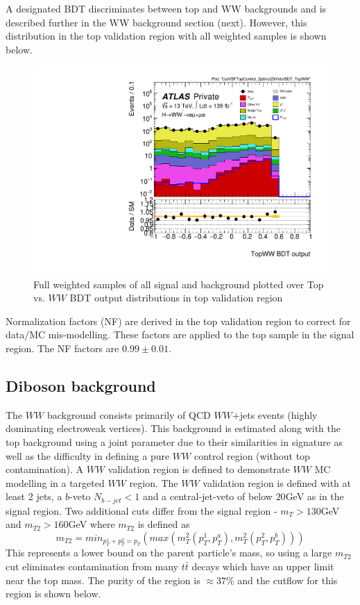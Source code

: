 A designated BDT discriminates between top and WW backgrounds and is described further in the WW background section (next). However, this distribution in the top validation region with all weighted samples is shown below. 

\begin{figure}[!htbp]
\centering
\includegraphics[width=.6\linewidth]{Pictures/run2-emme-CutVBFTopControl_2jetinclZttVeto-BDT_TopWW-log.pdf}
\caption{Full weighted samples of all signal and background plotted over Top vs. $WW$ BDT output distributions in top validation region}
\label{fig:TopWWBDTVR}
\end{figure}

Normalization factors (NF) are derived in the top validation region to correct for data/MC mis-modelling. These factors are applied to the top sample in the signal region. The NF factors are $0.99\pm0.01$. 

\subsection{Diboson background}

The $WW$ background consists primarily of QCD $WW$+jets events (highly dominating electroweak vertices). This background is estimated along with the top background using a joint parameter due to their similarities in signature as well as the difficulty in defining a pure $WW$ control region (without top contamination). A $WW$ validation region is defined to demonstrate $WW$ MC modelling in a targeted $WW$ region.  The $WW$ validation region is defined with at least 2 jets, a $b$-veto $N_{b-jet}<1$ and a central-jet-veto of below $20$GeV as in the signal region. Two additional cuts differ from the signal region - $m_T>130$GeV and $m_{T2}>160$GeV where $m_{T2}$ is defined as
\begin{equation}
m_{T2}=min_{p_T^1+p_T^2=p_T}(max(m_T^2(p_T^1,p_T^a),m_T^2(p_T^2,p_T^b)))
\end{equation}
This represents a lower bound on the parent particle's mass, so using a large $m_{T2}$ cut eliminates contamination from many $t\bar{t}$ decays which have an upper limit near the top mass. The purity of the region is $\approx 37\%$ and the cutflow for this region is shown below.


